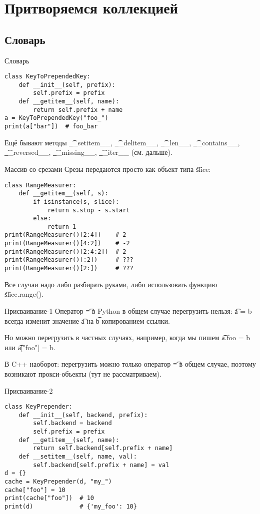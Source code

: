 \section{Притворяемся коллекцией}
\subsection{Словарь}
\begin{frame}
\end{frame}

\begin{frame}[fragile]{Словарь}
\begin{verbatim}
class KeyToPrependedKey:
    def __init__(self, prefix):
        self.prefix = prefix
    def __getitem__(self, name):
        return self.prefix + name
a = KeyToPrependedKey("foo_")
print(a["bar"])  # foo_bar
\end{verbatim}
	Ещё бывают методы \t{\_\_setitem\_\_}, \t{\_\_delitem\_\_}, \t{\_\_len\_\_}, \t{\_\_contains\_\_}, \t{\_\_reversed\_\_}, \t{\_\_missing\_\_}, \t{\_\_iter\_\_} (см. дальше).
\end{frame}

\begin{frame}[fragile]{Массив со срезами}
	Срезы передаются просто как объект типа \t{slice}:
\begin{verbatim}
class RangeMeasurer:
    def __getitem__(self, s):
        if isinstance(s, slice):
            return s.stop - s.start
        else:
            return 1
print(RangeMeasurer()[2:4])    # 2
print(RangeMeasurer()[4:2])    # -2
print(RangeMeasurer()[2:4:2])  # 2
print(RangeMeasurer()[:2])     # ???
print(RangeMeasurer()[2:])     # ???
\end{verbatim}
	\pause
	Все случаи надо либо разбирать руками, либо использовать функцию \t{slice.range()}.
\end{frame}

\begin{frame}{Присваивание-1}
	Оператор \t{=} в Python в общем случае перегрузить нельзя: \t{a = b}
	всегда изменит значение \t{a} на \t{b} копированием ссылки.

	Но можно перегрузить в частных случаях, например, когда мы пишем \t{a.foo = b}
	или \t{a["foo"] = b}.

	В C++ наоборот: перегрузить можно только оператор \t{=} в общем случае,
	поэтому возникают прокси-объекты (тут не рассматриваем).
\end{frame}

\begin{frame}[fragile]{Присваивание-2}
\begin{verbatim}
class KeyPrepender:
    def __init__(self, backend, prefix):
        self.backend = backend
        self.prefix = prefix
    def __getitem__(self, name):
        return self.backend[self.prefix + name]
    def __setitem__(self, name, val):
        self.backend[self.prefix + name] = val
d = {}
cache = KeyPrepender(d, "my_")
cache["foo"] = 10
print(cache["foo"])  # 10
print(d)             # {'my_foo': 10}
\end{verbatim}

\end{frame}
